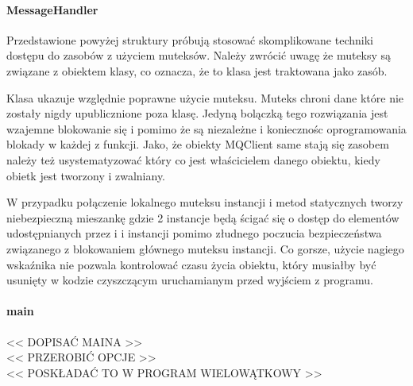 \paragraph{MessageHandler}
Przedstawione powyżej struktury próbują stosować skomplikowane techniki dostępu do zasobów z użyciem muteksów. Należy zwrócić uwagę że muteksy są związane z obiektem klasy, co oznacza, że to klasa jest traktowana jako zasób.

Klasa  ukazuje względnie poprawne użycie muteksu. Muteks chroni dane które nie zostały nigdy upublicznione poza klasę. Jedyną bolączką tego rozwiązania jest wzajemne blokowanie się  i  pomimo że są niezależne i koniecznośc oprogramowania blokady w każdej z funkcji. Jako, że obiekty MQClient same stają się zasobem należy też usystematyzować który co jest właścicielem danego obiektu, kiedy obietk jest tworzony i zwalniany.

W przypadku  połączenie lokalnego muteksu instancji i metod statycznych tworzy niebezpieczną mieszankę gdzie 2 instancje będą ścigać się o dostęp do elementów udostępnianych przez  i  i instancji  pomimo złudnego poczucia bezpieczeństwa związanego z blokowaniem głównego muteksu instancji. Co gorsze, użycie nagiego wskaźnika  nie pozwala kontrolować czasu życia obiektu, który musiałby być usunięty w kodzie czyszczącym uruchamianym przed wyjściem z programu.
\\
\paragraph{main}
<< DOPISAĆ MAINA >>\\
<< PRZEROBIĆ OPCJE >>\\
<< POSKŁADAĆ TO W PROGRAM WIELOWĄTKOWY >>
